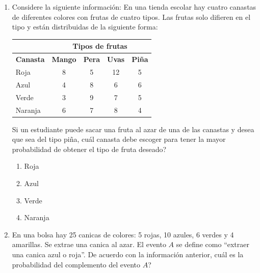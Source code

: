 \documentclass[11pt]{article}
\newcommand{\opcion}[2]{\item $#2$}
\begin{document}
\begin{enumerate}[label=\textbf{\arabic*.}, itemsep=2.5cm]
Si el estudiante desea obtener al menos un promedio ponderado final de $7{,}50$ en el curso, entonces, \textquestiondown qu\'e calificaci\'on, en escala de 0 a 10, deber\'a obtener como m\'inimo en producci\'on escrita para obtener ese promedio?

\begin{enumerate}[label=\Alph*)]
  \item $7{,}50$
  \opcion{B}{8{,}20}
  \item $8{,}80$
  \item $9{,}50$
\end{enumerate}


\Needspace{0.55\textheight}
\item
Considere la siguiente informaci\'on: En una tienda escolar hay cuatro canastas de diferentes colores con frutas de cuatro tipos. Las frutas solo difieren en el tipo y est\'an distribuidas de la siguiente forma:

\begin{center}
\renewcommand{\arraystretch}{1.2}
\begin{tabular}{|l|c|c|c|c|}
\hline
& \multicolumn{4}{c|}{\textbf{Tipos de frutas}} \\
\hline
\textbf{Canasta} & \textbf{Mango} & \textbf{Pera} & \textbf{Uvas} & \textbf{Pi\~na} \\
\hline
Roja    & 8 & 5 & 12 & 5 \\
Azul    & 4 & 8 &  6 & 6 \\
Verde   & 3 & 9 &  7 & 5 \\
Naranja & 6 & 7 &  8 & 4 \\
\hline
\end{tabular}
\end{center}

Si un estudiante puede sacar una fruta al azar de una de las canastas y desea que sea del tipo pi\~na, \textquestiondown cu\'al canasta debe escoger para tener la mayor probabilidad de obtener el tipo de fruta deseado?

\begin{enumerate}[label=\Alph*)]
  \item Roja
  \opcion{B}{\text{Azul}}
  \item Verde
  \item Naranja
\end{enumerate}

\Needspace{0.35\textheight}
\item
En una bolsa hay 25 canicas de colores: 5 rojas, 10 azules, 6 verdes y 4 amarillas. Se extrae una canica al azar. El evento $A$ se define como ``extraer una canica azul o roja''. De acuerdo con la informaci\'on anterior, \textquestiondown cu\'al es la probabilidad del complemento del evento $A$?


\end{enumerate}
\end{document}
